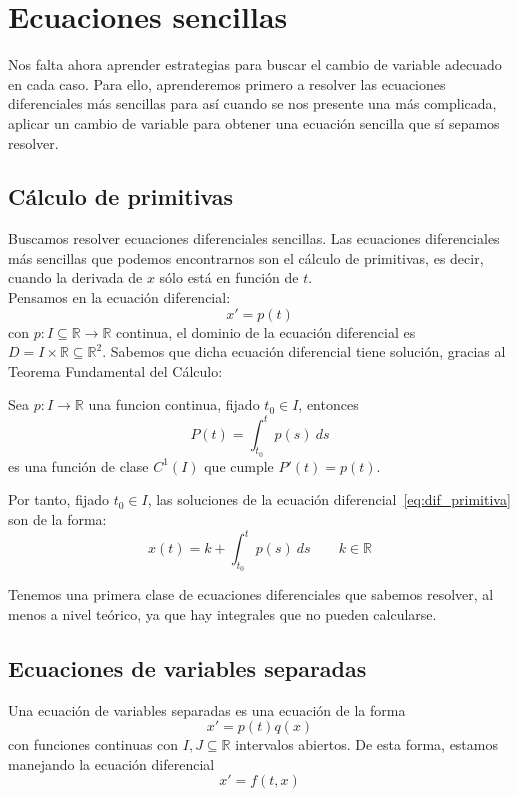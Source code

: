 \section{Ecuaciones sencillas}
Nos falta ahora aprender estrategias para buscar el cambio de variable adecuado en cada caso. Para ello, aprenderemos primero a resolver las ecuaciones diferenciales más sencillas para así cuando se nos presente una más complicada, aplicar un cambio de variable para obtener una ecuación sencilla que sí sepamos resolver.

\subsection{Cálculo de primitivas}
Buscamos resolver ecuaciones diferenciales sencillas. Las ecuaciones diferenciales más sencillas que podemos encontrarnos son el cálculo de primitivas, es decir, cuando la derivada de $x$ sólo está en función de $t$.\\

Pensamos en la ecuación diferencial:
\begin{equation}\label{eq:dif_primitiva}
    x' = p(t)
\end{equation}
con $p:I\subseteq \mathbb{R}\rightarrow\mathbb{R}$ continua, el dominio de la ecuación diferencial es $D = I\times \mathbb{R}\subseteq \mathbb{R}^2$. Sabemos que dicha ecuación diferencial tiene solución, gracias al Teorema Fundamental del Cálculo:

\begin{teo}
    Sea $p:I\rightarrow\mathbb{R}$ una funcion continua, fijado $t_0\in I$, entonces
    \begin{equation*}
        P(t) = \int_{t_0}^{t} p(s)~ds 
    \end{equation*}
    es una función de clase $C^1(I)$ que cumple $P'(t) = p(t)$.
\end{teo}
Por tanto, fijado $t_0 \in I$, las soluciones de la ecuación diferencial~\ref{eq:dif_primitiva} son de la forma:
\begin{equation*}
    x(t) = k + \int_{t_0}^{t} p(s)~ds  \qquad k\in \mathbb{R}
\end{equation*}

Tenemos una primera clase de ecuaciones diferenciales que sabemos resolver, al menos a nivel teórico, ya que hay integrales que no pueden calcularse.

\subsection{Ecuaciones de variables separadas}
Una ecuación de variables separadas es una ecuación de la forma
\begin{equation*}
    x' = p(t) q(x)
\end{equation*}
con funciones
continuas con $I,J\subseteq \mathbb{R}$ intervalos abiertos. De esta forma, estamos manejando la ecuación diferencial
\begin{equation*}
    x' = f(t,x)
\end{equation*}

